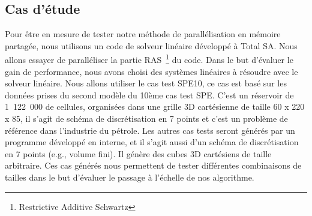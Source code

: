 \subsection{Cas d'étude}
Pour être en mesure de tester notre méthode de parallélisation en mémoire partagée, nous utilisons un code de solveur linéaire développé à Total SA.
%
Nous allons essayer de paralléliser la partie RAS~\footnote{Restrictive Additive Schwartz} du code.
%
Dans le but d'évaluer le gain de performance, nous avons choisi des systèmes linéaires à résoudre avec le solveur linéaire.
%
Nous allons utiliser le cas test SPE10, ce cas est basé sur les données prises du second modèle du 10ème cas test SPE\cite{SPE10}.
%
C'est un réservoir de 1~122~000 de cellules, organisées dans une grille 3D cartésienne de taille 60 x 220 x 85, il s'agit de schéma de discrétisation en 7 points et c'est un problème de référence dans l'industrie du pétrole.
%
Les autres cas tests seront générés par un programme développé en interne, et il s'agit aussi d'un schéma de discrétisation en 7 points (e.g., volume fini).
%
Il génère des cubes 3D cartésiens de taille arbitraire.
%
Ces cas générés nous permettent de tester différentes combinaisons de tailles dans le but d'évaluer le passage à l'échelle de nos algorithme.
